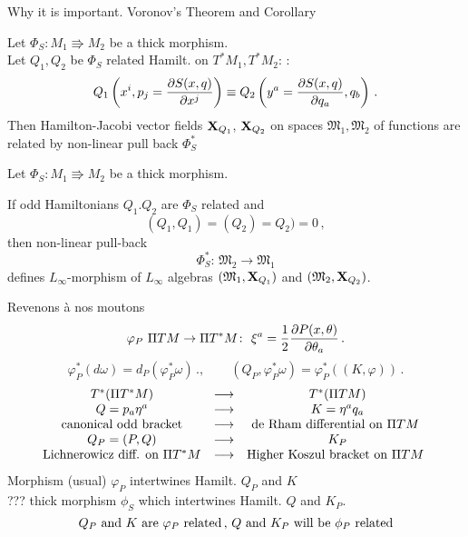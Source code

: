 \documentclass{beamer}
\def\w {{\omega}}
\def\p{\partial}
\def\M {{\mathfrak M}}
\def\p {\partial}
\def \X   {{\bf X}}
\begin{document}
\begin{frame} {Why it is important. Voronov's Theorem and Corollary}
\begin{theorem}

 Let $\Phi_S\colon M_1\Rrightarrow M_2$ be a thick morphism.\\

   Let $Q_1, Q_2$ be $\Phi_S$ related  Hamilt. on $T^*M_1, T^*M_2$: 
 :
             $$
     Q_1\left(x^i,p_j={\p S(x,q)\over \p x^j}\right)\equiv
     Q_2\left(y^a={\p S(x,q)\over \p q_a}, q_b\right)\,.
             $$
Then Hamilton-Jacobi vector fields $\X_{Q_1}$, $\X_{Q_2}$
on spaces $\M_1,\M_2$ of functions are 
related by non-linear pull back 
$\Phi_S^*$ 
\end{theorem}

\end{frame}
\begin{frame}
\begin{corollary}
 Let $\Phi_S\colon M_1\Rrightarrow M_2$ be a thick morphism.

If odd Hamiltonians  $Q_1.Q_2$ are $\Phi_S$ related and
              $$
(Q_1,Q_1)=(Q_2)=Q_2)=0\,,
              $$
then non-linear pull-back
        $$
  \Phi_S^* \colon\, \M_2\rightarrow \M_1
        $$ 
defines $L_\infty$-morphism of $L_\infty$ algebras $(\M_1, \X_{Q_1})$
and $(\M_2,\X_{Q_2})$.
\end{corollary}


\end{frame}
\begin{frame}{Revenons \`a   nos moutons}
         $$
      \varphi_P\,\,\Pi TM\to\Pi T^*M\colon\,\,
 \xi^a={1\over 2}{\p P(x,\theta)\over \p \theta_a}\,.
         $$
         $$
     \varphi_P^*(d\w)=d_P(\varphi_P^*\w)\,.,\qquad
(Q_P,\varphi_P^*\w)=\varphi_P^*\left((K,\varphi)\right)\,.
         $$
          $$
       \begin{matrix}
    T^*(\Pi T^*M) &\longrightarrow & T^*(\Pi TM)\cr
             Q=p_a\eta^a& \longrightarrow &  K=\eta^aq_a\cr
        \hbox{canonical odd bracket} &\longrightarrow&
         \hbox{de Rham differential on $\Pi TM$ }\cr
     Q_P=(P,Q)& \longrightarrow &  K_P\cr
        \hbox{Lichnerowicz diff. on $\Pi T^*M$} &\longrightarrow&
         \hbox{Higher Koszul bracket on $\Pi TM$ }\cr 
       \end{matrix}
        $$
         $$
         $$
Morphism (usual) $\varphi_P$ intertwines 
Hamilt. $Q_P$ and $K$\\

??? thick morphism $\phi_S$
which intertwines Hamilt. $Q$ and $K_P$.
        $$
  \hbox{$Q_P$ and $K$ are $\varphi_P$ related}\,,\,
  \hbox{$Q$ and $K_P$ will be  $\phi_P$ related}
        $$


\end{frame}
\end{document}
